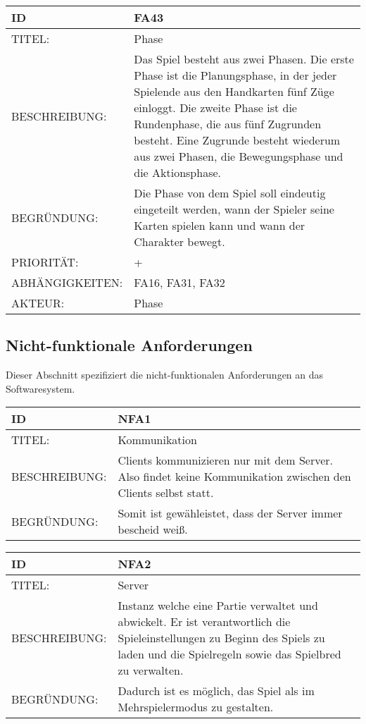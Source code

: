 \documentclass{uulm-assignment}
\begin{document}
    \begin{tabularx}{\textwidth}{|l|X |} \hline
        \textbf{ID} & \textbf{FA43} \\
        \hline
        TITEL: & Phase\\
        \hline
        BESCHREIBUNG: & Das Spiel besteht aus zwei Phasen. Die erste Phase
ist die Planungsphase, in der jeder Spielende aus den Handkarten fünf Züge einloggt. Die zweite
Phase ist die Rundenphase, die aus fünf Zugrunden besteht. Eine Zugrunde besteht wiederum aus
zwei Phasen, die Bewegungsphase und die Aktionsphase.
        \\
        \hline
        BEGRÜNDUNG: & Die Phase von dem Spiel soll eindeutig eingeteilt werden, wann der Spieler seine Karten spielen kann und wann der Charakter bewegt. \\
        \hline
        PRIORITÄT: & +\\
        \hline
        ABHÄNGIGKEITEN: & FA16, FA31, FA32 \\
        \hline
        AKTEUR: & Phase\\
        \hline
    \end{tabularx}
    

    \subsection{Nicht-funktionale Anforderungen}

    Dieser Abschnitt spezifiziert die nicht-funktionalen Anforderungen an das Softwaresystem.
    
    \begin{tabularx}{\textwidth}{|l|X |} \hline
        \textbf{ID} & \textbf{NFA1} \\
        \hline
        TITEL: & Kommunikation \\
        \hline
        BESCHREIBUNG: & Clients kommunizieren nur mit dem Server. Also findet keine Kommunikation zwischen den Clients selbst statt. \\
        \hline
        BEGRÜNDUNG: & Somit ist gewähleistet, dass der Server immer bescheid weiß. \\
        \hline
    \end{tabularx}
    
     \begin{tabularx}{\textwidth}{|l|X |} \hline
        \textbf{ID} & \textbf{NFA2} \\
        \hline
        TITEL: &  Server\\
        \hline
        BESCHREIBUNG: & Instanz welche eine Partie verwaltet und abwickelt.  Er ist verantwortlich die Spieleinstellungen zu Beginn des Spiels zu laden und die Spielregeln sowie das Spielbred zu verwalten.\\
        \hline
        BEGRÜNDUNG: &  Dadurch ist es möglich, das Spiel als im Mehrspielermodus zu gestalten.\\
        \hline
    \end{tabularx}
\end{document}
